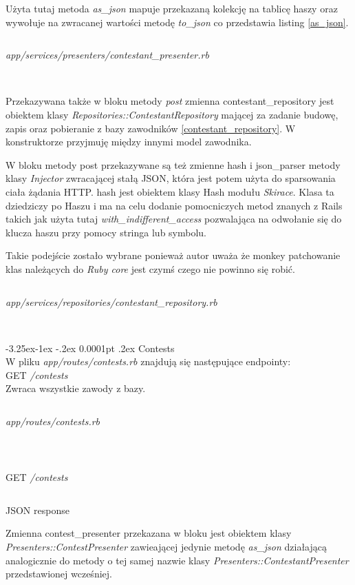 \documentclass[11pt,a4paper, twoside]{article}
\makeatletter
\renewcommand\subparagraph{\@startsection{paragraph}{6}{\z@} %
	{-3.25ex\@plus -1ex \@minus -.2ex} %
	{0.0001pt \@plus -1ex \@minus -.2ex} %
	{\normalfont\normalsize}}
\renewcommand\subparagraph{\@startsection{subparagraph}{5}{\z@}%
                                     {-3.25ex\@plus -1ex \@minus -.2ex}%
                                     {0.0001pt \@plus .2ex}%
                                     {\normalfont\normalsize\bfseries}}
\makeatother
\begin{document}
Użyta tutaj metoda \emph{as\_json} mapuje przekazaną kolekcję na tablicę haszy oraz wywołuje na zwracanej wartości metodę \emph{to\_json} co przedstawia listing \ref{as_json}.
\begin{listing}
\inputminted{ruby}{./src/contestants_as_json.rb}
\caption{\emph{app/services/presenters/contestant\_presenter.rb}}
$\label{as_json}$
\end{listing}


Przekazywana także w bloku metody \emph{post} zmienna contestant\_repository jest obiektem klasy \emph{Repositories::ContestantRepository} mającej za zadanie budowę, zapis oraz pobieranie z bazy zawodników \ref{contestant_repository}. W konstruktorze przyjmuję między innymi model zawodnika. %

W bloku metody post przekazywane są też zmienne hash i json\_parser metody klasy \emph{Injector} zwracającej stałą JSON, która jest potem użyta do sparsowania ciała żądania HTTP. hash jest obiektem klasy Hash modułu \emph{Skirace}. Klasa ta dziedziczy po Haszu i ma na celu dodanie pomocniczych metod znanych z Rails takich jak użyta tutaj \emph{with\_indifferent\_access} pozwalająca na odwołanie się do klucza haszu przy pomocy stringa lub symbolu. 

Takie podejście zostało wybrane ponieważ autor uważa że monkey patchowanie klas należących do \emph{Ruby core} jest czymś czego nie powinno się robić. 
\begin{listing}
\inputminted{ruby}{../app/services/repositories/contestant_repository.rb}
\caption{\emph{app/services/repositories/contestant\_repository.rb}}
$\label{contestant_repository}$
\end{listing}
\clearpage
\subparagraph{Contests} ~\\
W pliku \emph{app/routes/contests.rb} znajdują się następujące endpointy:
\\
GET \emph{/contests}
\\
\noindent
Zwraca wszystkie zawody z bazy.
\begin{listing}
\inputminted{ruby}{./src/get_contests.rb}
\caption{\emph{app/routes/contests.rb}}
$\label{contests}$
\end{listing}
\begin{listing}
\inputminted{ruby}{./src/curl_contests}
\caption{GET \emph{/contests}}
\end{listing}
\begin{listing}
\inputminted{ruby}{./src/curl_contests_resp}
\caption{JSON response}
\end{listing}
Zmienna contest\_presenter przekazana w bloku jest obiektem klasy \emph{Presenters::ContestPresenter} zawieającej jedynie metodę \emph{as\_json} działającą analogicznie do metody o tej samej nazwie klasy \emph{Presenters::ContestantPresenter} przedstawionej wcześniej.
\end{document}
